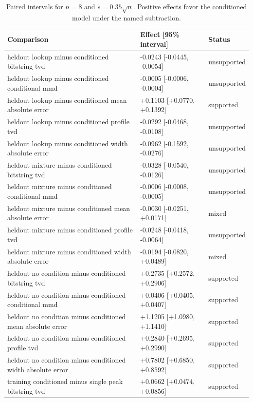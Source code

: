 \clearpage
\begin{table}[p]
\centering
\scriptsize
\setlength{\tabcolsep}{4pt}
\caption{Paired intervals for $n=8$ and $s=0.35\sqrt n$. Positive effects favor the conditioned model under the named subtraction.}
\label{tab:all-intervals-n8-w0.35}
\begin{tabular}{@{}p{}p{}p{}@{}}
\toprule
Comparison & Effect [95\% interval] & Status\\
\midrule
heldout lookup minus conditioned bitstring tvd & -0.0243 [-0.0445, -0.0054] & unsupported \\
heldout lookup minus conditioned conditional mmd & -0.0005 [-0.0006, -0.0004] & unsupported \\
heldout lookup minus conditioned mean absolute error & +0.1103 [+0.0770, +0.1392] & supported \\
heldout lookup minus conditioned profile tvd & -0.0292 [-0.0468, -0.0108] & unsupported \\
heldout lookup minus conditioned width absolute error & -0.0962 [-0.1592, -0.0276] & unsupported \\
heldout mixture minus conditioned bitstring tvd & -0.0328 [-0.0540, -0.0126] & unsupported \\
heldout mixture minus conditioned conditional mmd & -0.0006 [-0.0008, -0.0005] & unsupported \\
heldout mixture minus conditioned mean absolute error & -0.0030 [-0.0251, +0.0171] & mixed \\
heldout mixture minus conditioned profile tvd & -0.0248 [-0.0418, -0.0064] & unsupported \\
heldout mixture minus conditioned width absolute error & -0.0194 [-0.0820, +0.0489] & mixed \\
heldout no condition minus conditioned bitstring tvd & +0.2735 [+0.2572, +0.2906] & supported \\
heldout no condition minus conditioned conditional mmd & +0.0406 [+0.0405, +0.0407] & supported \\
heldout no condition minus conditioned mean absolute error & +1.1205 [+1.0980, +1.1410] & supported \\
heldout no condition minus conditioned profile tvd & +0.2840 [+0.2695, +0.2990] & supported \\
heldout no condition minus conditioned width absolute error & +0.7802 [+0.6850, +0.8592] & supported \\
training conditioned minus single peak bitstring tvd & +0.0662 [+0.0474, +0.0856] & supported \\

\end{tabular}
\end{table}
